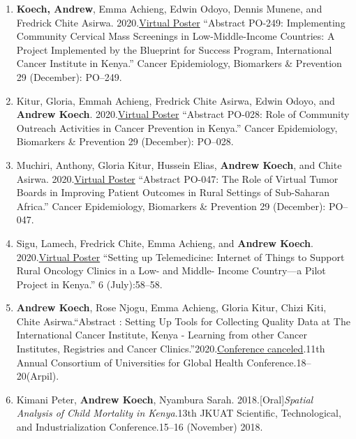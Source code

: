 \documentclass[12.5pt,]{article}
\begin{document}
\begin{enumerate}
\def\labelenumi{\arabic{enumi}.}
\item
  \textbf{Koech, Andrew}, Emma Achieng, Edwin Odoyo, Dennis Munene, and
  Fredrick Chite Asirwa.
  2020.\href{https://doi.org/10.1158/1538-7755.DISP20-PO-249.}{Virtual
  Poster} ``Abstract PO-249: Implementing Community Cervical Mass
  Screenings in Low-Middle-Income Countries: A Project Implemented by
  the Blueprint for Success Program, International Cancer Institute in
  Kenya.'' Cancer Epidemiology, Biomarkers \& Prevention 29 (December):
  PO--249.
\item
  Kitur, Gloria, Emmah Achieng, Fredrick Chite Asirwa, Edwin Odoyo, and
  \textbf{Andrew Koech}.
  2020.\href{https://doi.org/10.1158/1538-7755.DISP20-PO-028.}{Virtual
  Poster} ``Abstract PO-028: Role of Community Outreach Activities in
  Cancer Prevention in Kenya.'' Cancer Epidemiology, Biomarkers \&
  Prevention 29 (December): PO--028.
\item
  Muchiri, Anthony, Gloria Kitur, Hussein Elias, \textbf{Andrew Koech},
  and Chite Asirwa.
  2020.\href{https://doi.org/10.1158/1538-7755.DISP20-PO-047.}{Virtual
  Poster} ``Abstract PO-047: The Role of Virtual Tumor Boards in
  Improving Patient Outcomes in Rural Settings of Sub-Saharan Africa.''
  Cancer Epidemiology, Biomarkers \& Prevention 29 (December): PO--047.
\item
  Sigu, Lamech, Fredrick Chite, Emma Achieng, and \textbf{Andrew Koech}.
  2020.\href{https://doi.org/10.1200/GO.20.54000}{Virtual Poster}
  ``Setting up Telemedicine: Internet of Things to Support Rural
  Oncology Clinics in a Low- and Middle- Income Country---a Pilot
  Project in Kenya.'' 6 (July):58--58.
\item
  \textbf{Andrew Koech}, Rose Njogu, Emma Achieng, Gloria Kitur, Chizi
  Kiti, Chite Asirwa.``Abstract : Setting Up Tools for Collecting
  Quality Data at The International Cancer Institute, Kenya - Learning
  from other Cancer Institutes, Registries and Cancer
  Clinics.''2020.\href{https://www.dropbox.com/s/lq0owvwya6dcjfh/1\%20CUGH\%202020\%20eBook_Abstracts_Global\%20Health\%20Education.pdf?dl=0}{Conference
  canceled}.11th Annual Consortium of Universities for Global Health
  Conference.18--20(Arpil).
\item
  Kimani Peter, \textbf{Andrew Koech}, Nyambura Sarah.
  2018.{[}Oral{]}\emph{Spatial Analysis of Child Mortality in
  Kenya}.13th JKUAT Scientific, Technological, and Industrialization
  Conference.15--16 (November) 2018.
\end{enumerate}
\end{document}
